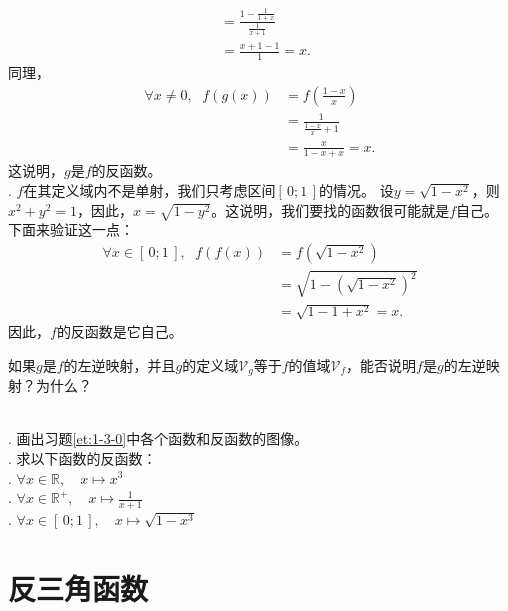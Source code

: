 \documentclass[12pt,UTF8]{ctexbook}
\begin{document}
\begin{so}
\begin{align*}
                                  &= \frac{1 - \frac{1}{1 + x}}{\frac{1}{x + 1}}  \\
                                  &= \frac{x + 1 - 1}{1} = x. 
    \end{align*} 
    同理，
    \begin{align*}
        \forall x \neq 0, \;\,\, f(g(x)) &= f\left(\frac{1 - x}{x}\right)  \\
                                  &= \frac{1}{\frac{1 - x}{x} + 1}  \\
                                  &= \frac{x}{1 - x + x} = x. 
    \end{align*} 
    这说明，$g$是$f$的反函数。\\  
    . $f$在其定义域内不是单射，我们只考虑区间$[\,0;1\,]$的情况。
    设$y = \sqrt{1 - x^2}$，则$x^2 + y^2 = 1$，因此，$x = \sqrt{1 - y^2}$。这说明，我们要找的函数很可能就是$f$自己。
    下面来验证这一点：
    \begin{align*}
        \forall x\in [\,0;1\,], \;\,\, f(f(x)) &= f\left(\sqrt{1 - x^2}\right)  \\
                                  &= \sqrt{1 - \left(\sqrt{1 - x^2}\right)^2}  \\
                                  &= \sqrt{1 - 1 + x^2} = x. 
    \end{align*} 
    因此，$f$的反函数是它自己。
\end{so}

\begin{sk}
    如果$g$是$f$的左逆映射，并且$g$的定义域$\mathcal{V}_g$等于$f$的值域$\mathcal{V}_f$，能否说明$f$是$g$的左逆映射？为什么？
\end{sk}
\begin{xt}
    \mbox{} \\
    . 画出习题\ref{et:1-3-0}中各个函数和反函数的图像。\\
    . 求以下函数的反函数：\\
    . $\forall x\in \mathbb{R}, \quad x\mapsto x^3$ \\
    . $\forall x\in \mathbb{R}^+, \quad x\mapsto \frac{1}{x + 1}$ \\
    . $\forall x\in [\,0;1\,], \quad x\mapsto \sqrt{1 - x^3} $
\end{xt}

\section{反三角函数}
\end{document}
